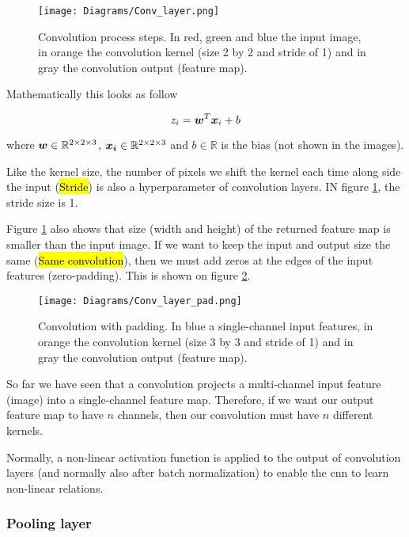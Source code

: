 \begin{figure}[!ht]
  \centering
  \texttt{[image: Diagrams/Conv\_layer.png]}
  \caption{Convolution process steps. In red, green and blue the input image, in orange the convolution kernel (size 2 by 2 and stride of 1) and in gray the convolution output (feature map).}
  \label{fig:basics:conv_layer}
\end{figure}

Mathematically this looks as follow

\begin{equation}
  z_i = \boldsymbol{w}^T \boldsymbol{x}_i + b
\end{equation}

where $\boldsymbol{w}\in\mathbb{R}^{2 \times 2 \times 3}$, $\boldsymbol{x_i}\in\mathbb{R}^{2 \times 2 \times 3}$ and $b\in\mathbb{R}$ is the bias (not shown in the images).

Like the kernel size, the number of pixels we shift the kernel each time along side the input (\hl{Stride}) is also a hyperparameter of convolution layers. IN figure \ref{fig:basics:conv_layer}, the stride size is 1.

Figure \ref{fig:basics:conv_layer} also shows that size (width and height) of the returned feature map is smaller than the input image. If we want to keep the input and output size the same (\hl{Same convolution}), then we must add zeros at the edges of the input features (zero-padding). This is shown on figure \ref{fig:basics:conv_layer_pad}.

\begin{figure}[!ht]
  \centering
  \texttt{[image: Diagrams/Conv\_layer\_pad.png]}
  \caption{Convolution with padding. In blue a single-channel input features, in orange the convolution kernel (size 3 by 3 and stride of 1) and in gray the convolution output (feature map).}
  \label{fig:basics:conv_layer_pad}
\end{figure}

So far we have seen that a convolution projects a multi-channel input feature (image) into a single-channel feature map. Therefore, if we want our output feature map to have $n$ channels, then our convolution must have $n$ different kernels.

Normally, a non-linear activation function is applied to the output of convolution layers (and normally also after batch normalization) to enable the \gls{cnn} to learn non-linear relations.

\subsubsection{Pooling layer}

